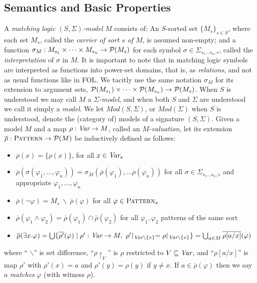 \documentclass[UTF8,11pt]{article}
\theoremstyle{plain}
\theoremstyle{definition}
\theoremstyle{remark}
\newcommand{\Mod}{\textit{Mod}}
\newcommand{\Pattern}{\textsc{Pattern}\xspace}
\begin{document}
\subsection{Semantics and Basic Properties}
\label{sec:semantics}

A \emph{matching logic $(S,\Sigma)$-model} $M$ consists of:
An $S$-sorted set $\{M_s\}_{s\in S}$, where each set $M_s$,
called the \emph{carrier of sort $s$ of $M$}, is assumed
non-empty; and a function
$\sigma_M:M_{s_1}\times\cdots\times M_{s_n} \rightarrow {\cal P}(M_s)$
for each symbol $\sigma\in\Sigma_{s_1\ldots s_n,s}$, called the
\emph{interpretation} of $\sigma$ in $M$.
It is important to note that in matching logic symbols are interpreted as
functions into power-set domains, that is, as \emph{relations}, and not as
usual functions like in FOL.
We tacitly use the same notation $\sigma_M$ for its extension
to argument sets,
${\cal P}(M_{s_1})\times\cdots\times {\cal P}(M_{s_n}) \rightarrow {\cal P}(M_s)$.
When $S$ is understood we may call $M$ a \emph{$\Sigma$-model}, and when
both $S$ and $\Sigma$ are understood we call it simply a \emph{model}.
We let $\Mod(S,\Sigma)$, or $\Mod(\Sigma)$ when $S$ is understood, denote
the (category of) models of a signature $(S,\Sigma)$.
%
Given a model $M$ and a map
$\rho:\textit{Var}\rightarrow M$, called an \emph{$M$-valuation}, let its extension
$\overline{\rho}:\Pattern\rightarrow{\cal P}(M)$
be inductively defined as follows:\vspace*{-2ex}
\begin{itemize}\itemsep-1ex
\item $\overline{\rho}(x) = \{\rho(x)\}$, for all $x\in\textit{Var}_s$
\item $\overline{\rho}(\sigma(\varphi_{1},\ldots,\varphi_{n}))=
\sigma_M(\overline{\rho}(\varphi_1),\ldots \overline{\rho}(\varphi_n))$ for all
$\sigma\in\Sigma_{s_1...s_n,s}$ and appropriate $\varphi_1,...,\varphi_n$
\item $\overline{\rho}(\neg\varphi) = M_s \ \backslash\ \overline{\rho}(\varphi)$ for all
$\varphi\in\Pattern_s$
\item $\overline{\rho}(\varphi_1 \wedge \varphi_2) =
\overline{\rho}(\varphi_1) \cap \overline{\rho}(\varphi_2)$
for all $\varphi_1, \varphi_2$ patterns of the same sort
\item $\overline{\rho}(\exists x . \varphi) =
\bigcup\{\overline{\rho'}(\varphi) \mid \rho':\Var\rightarrow M,\ 
\rho'\!\!\upharpoonright_{\Var\backslash\{x\}} =
\rho\!\!\upharpoonright_{\Var\backslash\{x\}}\}
= \bigcup_{a\in M} \overline{\rho[a/x]}(\varphi)
$
\end{itemize}\vspace*{-.5ex}
where `` $\backslash$'' is set difference,
``$\rho\!\!\upharpoonright_V$'' is
$\rho$ restricted to $V \subseteq \textit{Var}$,
and ``$\rho[a/x]$'' is map $\rho'$ with $\rho'(x)=a$ and $\rho'(y)=\rho(y)$ if
$y\neq x$.
If $a\in \overline{\rho}(\varphi)$ then we say $a$ \emph{matches}
$\varphi$ (with witness $\rho$).
\end{document}
